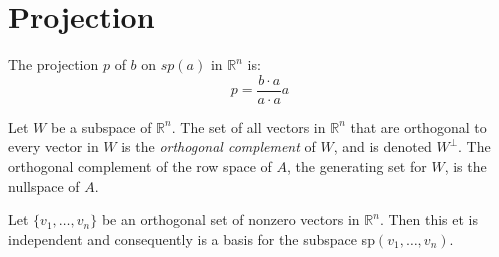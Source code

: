 \documentclass[nobib,notoc]{tufte-handout}
\begin{document}
\section{Projection}
\begin{thm}
	The projection \(p\) of \(b\) on \(sp(a)\) in \(\mathbb{R}^n\) is:
	\begin{equation*}
		p=\frac{b\cdot a}{a\cdot a}a
	\end{equation*}
\end{thm}
\begin{defi}
	Let \(W\) be a subspace of \(\mathbb{R}^n\). The set of all vectors in \(\mathbb{R}^n\) that are orthogonal to every vector in \(W\) is the \emph{orthogonal complement} of \(W\), and is denoted \(W^\bot\). The orthogonal complement of the row space of \(A\), the generating set for \(W\), is the nullspace of \(A\).
\end{defi}
\begin{thm}
	Let \(\{v_1,\ldots,v_n\}\) be an orthogonal set of nonzero vectors in \(\mathbb{R}^n\). Then this et is independent and consequently is a basis for the subspace sp\((v_1,\ldots,v_n)\).
\end{thm}
\end{document}
